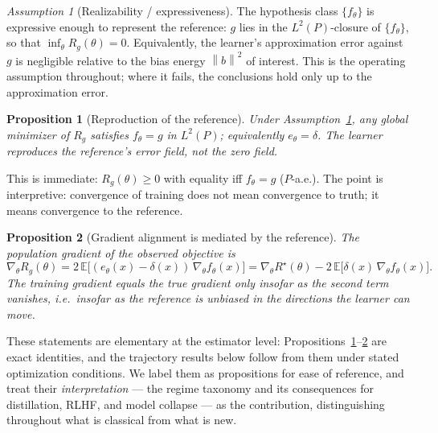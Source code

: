 \documentclass[10pt]{article} %
\theoremstyle{plain}
\newtheorem{proposition}{Proposition}
\theoremstyle{remark}
\newtheorem{assumption}{Assumption}
\newcommand{\E}{\mathbb{E}}
\newcommand{\norm}[1]{\left\lVert #1 \right\rVert}
\begin{document}
\begin{assumption}[Realizability / expressiveness]
\label{ass:realizable}
The hypothesis class $\{f_\theta\}$ is expressive enough to represent the reference: $g$ lies in the $L^2(P)$-closure of $\{f_\theta\}$, so that $\inf_\theta R_g(\theta)=0$. Equivalently, the learner's approximation error against $g$ is negligible relative to the bias energy $\norm{b}^2$ of interest. This is the operating assumption throughout; where it fails, the conclusions hold only up to the approximation error.
\end{assumption}

\begin{proposition}[Reproduction of the reference]
\label{prop:reproduction}
Under Assumption~\ref{ass:realizable}, any global minimizer of $R_g$ satisfies $f_\theta = g$ in $L^2(P)$; equivalently $e_\theta = \delta$. The learner reproduces the reference's error field, not the zero field.
\end{proposition}
\noindent This is immediate: $R_g(\theta)\ge 0$ with equality iff $f_\theta = g$ ($P$-a.e.). The point is interpretive: convergence of training does not mean convergence to truth; it means convergence to the reference.

\begin{proposition}[Gradient alignment is mediated by the reference]
\label{prop:grad}
The population gradient of the observed objective is
\[
\nabla_\theta R_g(\theta) = 2\,\E\big[(e_\theta(x)-\delta(x))\,\nabla_\theta f_\theta(x)\big]
= \nabla_\theta R^\star(\theta) - 2\,\E\big[\delta(x)\,\nabla_\theta f_\theta(x)\big].
\]
The training gradient equals the true gradient only insofar as the second term vanishes, i.e.\ insofar as the reference is unbiased \emph{in the directions the learner can move}.
\end{proposition}

\noindent These statements are elementary at the estimator level: Propositions~\ref{prop:reproduction}--\ref{prop:grad} are exact identities, and the trajectory results below follow from them under stated optimization conditions. We label them as propositions for ease of reference, and treat their \emph{interpretation} --- the regime taxonomy and its consequences for distillation, RLHF, and model collapse --- as the contribution, distinguishing throughout what is classical from what is new.
\end{document}

